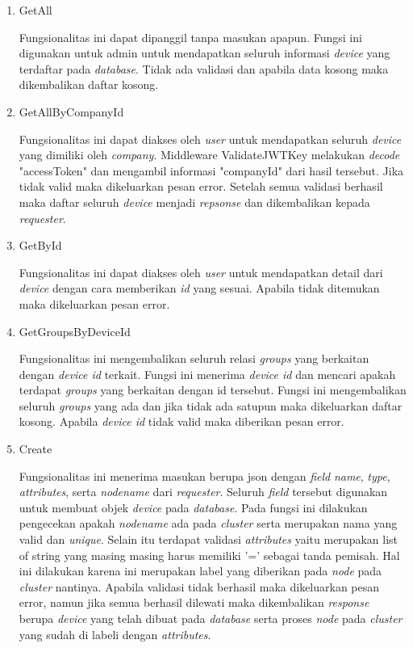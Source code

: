 \pagebreak

\begin{enumerate}
  \item GetAll

        Fungsionalitas ini dapat dipanggil tanpa masukan apapun. Fungsi ini digunakan untuk admin untuk mendapatkan seluruh informasi \textit{device} yang terdaftar pada \textit{database}. Tidak ada validasi dan apabila data kosong maka dikembalikan daftar kosong.

  \item GetAllByCompanyId

        Fungsionalitas ini dapat diakses oleh \textit{user} untuk mendapatkan seluruh \textit{device} yang dimiliki oleh \textit{company}. Middleware ValidateJWTKey  melakukan \textit{decode} "accessToken" dan mengambil informasi "companyId" dari hasil tersebut. Jika tidak valid maka dikeluarkan pesan error. Setelah semua validasi berhasil maka daftar seluruh \textit{device} menjadi \textit{repsonse} dan dikembalikan kepada \textit{requester}.

  \item GetById

        Fungsionalitas ini dapat diakses oleh \textit{user} untuk mendapatkan detail dari \textit{device} dengan cara memberikan \textit{id} yang sesuai. Apabila tidak ditemukan maka dikeluarkan pesan error.

  \item GetGroupsByDeviceId


        Fungsionalitas ini mengembalikan seluruh relasi \textit{groups} yang berkaitan dengan \textit{device id} terkait. Fungsi ini menerima \textit{device id} dan mencari apakah terdapat \textit{groups} yang berkaitan dengan id tersebut. Fungsi ini mengembalikan seluruh \textit{groups} yang ada dan jika tidak ada satupun maka dikeluarkan daftar kosong. Apabila \textit{device id} tidak valid maka diberikan pesan error.

  \item Create

        Fungsionalitas ini menerima masukan berupa json dengan \textit{field} \textit{name}, \textit{type}, \textit{attributes}, serta \textit{node\textunderscore name} dari \textit{requester}. Seluruh \textit{field} tersebut digunakan untuk membuat objek \textit{device} pada \textit{database}. Pada fungsi ini dilakukan pengecekan apakah \textit{node\textunderscore name} ada pada \textit{cluster} serta merupakan nama yang valid dan \textit{unique}. Selain itu terdapat validasi \textit{attributes} yaitu merupakan list of string yang masing masing harus memiliki '=' sebagai tanda pemisah. Hal ini dilakukan karena ini merupakan label yang diberikan pada \textit{node} pada \textit{cluster} nantinya. Apabila validasi tidak berhasil maka dikeluarkan pesan error, namun jika semua berhasil dilewati maka dikembalikan \textit{response} berupa \textit{device} yang telah dibuat pada \textit{database} serta proses \textit{node} pada \textit{cluster} yang sudah di labeli dengan \textit{attributes}.


\end{enumerate}
